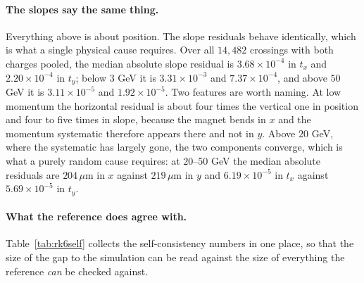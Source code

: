 \documentclass[11pt,a4paper]{article}
\newcommand{\um}{\ensuremath{\,\mu\mathrm{m}}}
\begin{document}
\paragraph{The slopes say the same thing.} Everything above is about position.
The slope residuals behave identically, which is what a single physical cause
requires. Over all $14{,}482$ crossings with both charges pooled, the median
absolute slope residual is $3.68 \times 10^{-4}$ in $t_x$ and $2.20 \times
10^{-4}$ in $t_y$; below $3$ GeV it is $3.31 \times 10^{-3}$ and $7.37 \times
10^{-4}$, and above $50$ GeV it is $3.11 \times 10^{-5}$ and $1.92 \times
10^{-5}$. Two features are worth naming. At low momentum the horizontal residual
is about four times the vertical one in position and four to five times in slope,
because the magnet bends in $x$ and the momentum systematic therefore appears
there and not in $y$. Above $20$ GeV, where the systematic has largely gone, the
two components converge, which is what a purely random cause requires: at
$20$--$50$ GeV the median absolute residuals are $204\um$ in $x$ against $219\um$
in $y$ and $6.19 \times 10^{-5}$ in $t_x$ against $5.69 \times 10^{-5}$ in $t_y$.

\paragraph{What the reference does agree with.} Table~\ref{tab:rk6self} collects
the self-consistency numbers in one place, so that the size of the gap to the
simulation can be read against the size of everything the reference \emph{can}
be checked against.
\end{document}
